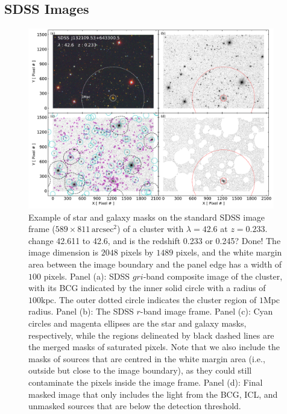 \documentclass[fleqn,usenatbib]{mnras}
\newcommand{\sqarcsec}{\mathrm{arcsec}^{2}}
\newcommand{\mpc}{\mathrm{Mpc}}
\newcommand{\kpc}{\mathrm{kpc}}
\newcommand\ying[1]{{\color{red} {#1}}}
\newcommand\xkchen[1]{{\color{cyan} {#1}}}
\begin{document}
\subsection{SDSS Images}
\label{subsec:img}

\begin{figure}
\centering\includegraphics[width=0.96\textwidth]{fig/img_process.pdf}
\caption{Example of star and galaxy masks on the standard
    SDSS image frame ($589\times 811\,\sqarcsec$) of a cluster with
    $\lambda{=}42.6$ at $z=0.233$.\ying{change 42.611 to 42.6, and is the
    redshift 0.233 or 0.245?} \xkchen{Done!} The image dimension is $2048$ pixels by
    $1489$ pixels, and the white margin area between the image boundary and
    the panel edge has a width of $100$ pixels. Panel (a): SDSS $gri$-band
    composite image of the cluster, with its BCG indicated by the inner
    solid circle with a radius of $100\kpc$. The outer dotted circle
    indicates the cluster region of $1\mpc$ radius.  Panel (b): The SDSS
    $r$-band image frame. Panel (c): Cyan circles and magenta ellipses are
    the star and galaxy masks, respectively, while the regions delineated
    by black dashed lines are the merged masks of saturated pixels. Note
    that we also include the masks of sources that are centred in the white
    margin area (i.e., outside but close to the image boundary), as they
    could still contaminate the pixels inside the image frame. Panel (d):
    Final masked image that only includes the light from the BCG, ICL, and
    unmasked sources that are below the detection threshold.
    \label{fig:demo_mask} }
\end{figure}
\end{document}
